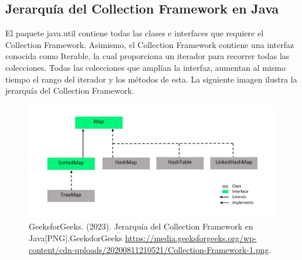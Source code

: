 \documentclass{report}
\begin{document}
      \subsection*{Jerarquía del Collection Framework en Java}El paquete java.util contiene todas las clases e interfaces que requiere el Collection Framework. Asimismo, el Collection Framework contiene una interfaz conocida como Iterable, la cual proporciona un iterador para recorrer todas las colecciones. Todas las colecciones que amplían la interfaz, aumentan al mismo tiempo el rango del iterador y los métodos de esta. La siguiente imagen ilustra la jerarquía del Collection Framework.
    \begin{figure}[h]
    \centering
    \includegraphics[width=1\linewidth]{Collection-Framework-2.png}
    \caption{GeeksforGeeks. (2023). Jerarquía del Collection Framework en Java[PNG].GeeksforGeeks
\href{https://media.geeksforgeeks.org/wp-content/uploads/20230124151239/Collections-in-Java-768.png}{https://media.geeksforgeeks.org/wp-content/cdn-uploads/20200811210521/Collection-Framework-1.png}.}
\end{figure}
\end{document}
